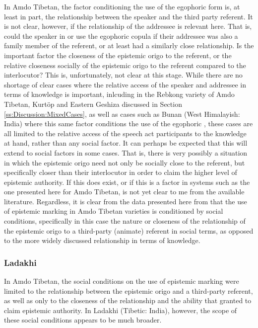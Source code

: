 In Amdo Tibetan, the factor conditioning the use of the egophoric form is, at least in part, the relationship between the speaker and the third party referent. It is not clear, however, if the relationship of the addressee is relevant here. That is, could the speaker in  or  use the egophoric copula if their addressee was also a family member of the referent, or at least had a similarly close relationship. Is the important factor the closeness of the epistemic origo to the referent, or the relative closeness socially of the epistemic origo to the referent compared to the interlocutor? This is, unfortunately, not clear at this stage. While there are no shortage of clear cases where the relative access of the speaker and addressee in terms of knowledge is important, inlcuding in the Rebkong variety of Amdo Tibetan, Kurtöp and Eastern Geshiza discussed in Section \ref{ss:Discussion:MixedCases}, as well as cases such as Bunan (West Himalayish: India) where this same factor conditions the use of the egophoric \cite[469]{Widmer2014}, these cases are all limited to the relative access of the speech act participants to the knowledge at hand, rather than any social factor. It can perhaps be expected that this will extend to social factors in some cases. That is, there is very possibly a situation in which the epistemic origo need not only be socially close to the referent, but specifically closer than their interlocutor in order to claim the higher level of epistemic authority. If this does exist, or if this is a factor in systems such as the one presented here for Amdo Tibetan, is not yet clear to me from the available literature. Regardless, it is clear from the data presented here from  that the use of epistemic marking in Amdo Tibetan varieties is conditioned by social conditions, specifically in this case the nature or closeness of the relationship of the epistemic origo to a third-party (animate) referent in social terms, as opposed to the more widely discussed relationship in terms of knowledge.

\subsubsection{Ladakhi}\label{sss:Discussion:LadakhiCase}
In Amdo Tibetan, the social conditions on the use of epistemic marking were limited to the relationship between the epistemic origo and a third-party referent, as well as only to the closeness of the relationship and the ability that granted to claim epistemic authority. In Ladakhi (Tibetic: India), however, the scope of these social conditions appears to be much broader.

